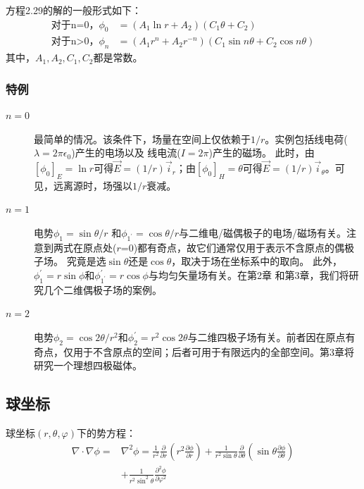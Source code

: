 方程2.29的解的一般形式如下：
\begin{subequations}
	\begin{align}
\mbox{对于n=0，}\phi_{0} &= (A_1 \ln r+A_2)(C_1 \theta+C_2) \\
\mbox{对于n>0，} \phi_{n} &= (A_1 r^n+A_2 r^{-n})(C_1 \sin n\theta +C_2 \cos n\theta)
	\end{align}
\end{subequations}
其中，$A_1, A_2, C_1, C_2$都是常数。

\subsubsection{特例}
\begin{description}
  \item[$n=0$] 最简单的情况。该条件下，场量在空间上仅依赖于$1/r$。实例包括线电荷($\lambda=2\pi \epsilon_0$)产生的电场以及  线电流($I=2\pi$)产生的磁场。
  此时，由$[\phi_0]_E=\ln r$可得$\vec{E}=(1/r)\vec{i}_r $；由$[\phi_0]_H=\theta$可得$\vec{E}=(1/r)\vec{i}_{\theta}$。可见，远离源时，场强以$1/r$衰减。
\item[$n=1$] 电势$\phi_1=\sin\theta/r$ 和$\phi_{1^\prime}=\cos \theta/r$与二维电/磁偶极子的电场/磁场有关。注意到两式在原点处($r$=0)都有奇点，故它们通常仅用于表示不含原点的偶极子场。
究竟是选$\sin\theta$还是$\cos\theta$，取决于场在坐标系中的取向。
此外，$\phi_1^\prime=r \sin \phi$和$\phi_{1^\prime}^\prime=r \cos \phi$与均匀矢量场有关。在第2章
和第3章，我们将研究几个二维偶极子场的案例。
 \item[$n=2$] 电势$\phi_2=\cos 2\theta/r^2$和$\phi_2^\prime= r^2 \cos 2\theta$与二维四极子场有关。前者因在原点有奇点，仅用于不含原点的空间；后者可用于有限远内的全部空间。第3章将研究一个理想四极磁体。
\end{description}

\subsection{球坐标}
球坐标$(r, \theta, \varphi)$下的势方程：
\begin{equation}\label{eqn:laplace sph1}
\begin{split}
  \nabla\cdot\nabla\phi=&\nabla^2\phi=\frac{1}{r^2}\frac{\partial}{\partial r}\left(r^2\frac{\partial \phi}{\partial r}\right)
  +\frac{1}{r^2\sin \theta}\frac{\partial}{\partial \theta}\left(\sin\theta\frac{\partial \phi}{\partial \theta}\right)\\
  &+\frac{1}{r^2\sin^2 \theta}\frac{\partial^2 \phi}{\partial \varphi^2}
\end{split}
\end{equation}

